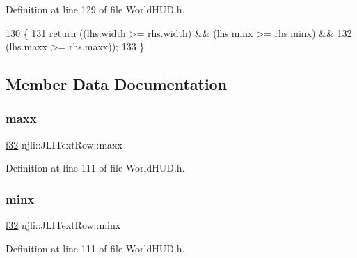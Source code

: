 Definition at line 129 of file World\+H\+U\+D.\+h.


\begin{DoxyCode}
130     \{
131       \textcolor{keywordflow}{return} ((lhs.width >= rhs.width) && (lhs.minx >= rhs.minx) &&
132               (lhs.maxx >= rhs.maxx));
133     \}
\end{DoxyCode}


\subsection{Member Data Documentation}
\mbox{\label{structnjli_1_1_j_l_i_text_row_a4721c180f0c8e5d637900c37e9bdb1d5}} 
\subsubsection{\texorpdfstring{maxx}{maxx}}
{\footnotesize\ttfamily \mbox{\hyperlink{_util_8h_a5f6906312a689f27d70e9d086649d3fd}{f32}} njli\+::\+J\+L\+I\+Text\+Row\+::maxx\hspace{0.3cm}{\ttfamily [private]}}



Definition at line 111 of file World\+H\+U\+D.\+h.

\mbox{\label{structnjli_1_1_j_l_i_text_row_ae14ecb70a2695a2d483416491b5c3f7c}} 
\subsubsection{\texorpdfstring{minx}{minx}}
{\footnotesize\ttfamily \mbox{\hyperlink{_util_8h_a5f6906312a689f27d70e9d086649d3fd}{f32}} njli\+::\+J\+L\+I\+Text\+Row\+::minx\hspace{0.3cm}{\ttfamily [private]}}



Definition at line 111 of file World\+H\+U\+D.\+h.

\mbox{\label{structnjli_1_1_j_l_i_text_row_a94b1a25f325ac2fd07b319026148c610}} 
